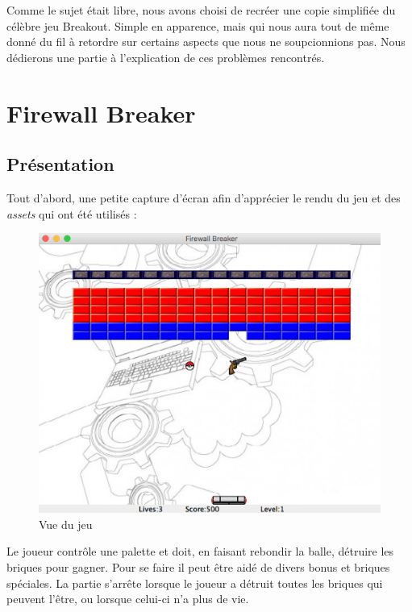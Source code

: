 \documentclass[a4paper,10pt]{article}
\begin{document}
Comme le sujet était libre, nous avons choisi de recréer une copie simplifiée du célèbre jeu Breakout.
Simple en apparence, mais qui nous aura tout de même donné du fil à retordre sur certains aspects
que nous ne soupcionnions pas. Nous dédierons une partie à l'explication de ces problèmes rencontrés.


\section{Firewall Breaker}
\subsection{Présentation}
    Tout d'abord, une petite capture d'écran afin d'apprécier le rendu du jeu et des \textit{assets} qui ont été
    utilisés  :

\FloatBarrier
		\begin{figure}[!h]
    		\begin{center}
	   	  	\includegraphics[scale= 0.5]{images/gameView.png}
          	\caption{Vue du jeu}
    		\end{center}
		\end{figure}
\FloatBarrier

Le joueur contrôle une palette et doit, en faisant rebondir la balle, détruire les briques pour gagner.
Pour se faire il peut être aidé de divers bonus et briques spéciales. La partie s'arrête lorsque le joueur
a détruit toutes les briques qui peuvent l'être, ou lorsque celui-ci n'a plus de vie.
\end{document}

